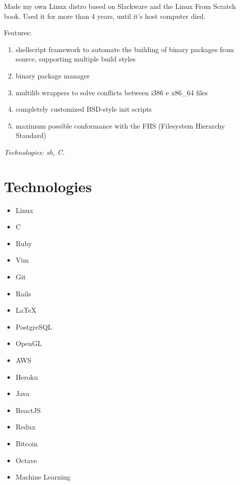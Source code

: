 \documentclass[a4paper]{simplecv}
\begin{document}
\begin{topic}
	Made my own Linux distro based on Slackware and the Linux From Scratch
	book. Used it for more than 4 years, until it's host computer died.

	Features:

	\begin{enumerate}
		\item shellscript framework to automate the building of binary
			packages from source, supporting multiple build styles

		\item binary package manager

		\item multilib wrappers to solve conflicts between i386 e
			x86\_64 files

		\item completely customized BSD-style init scripts

		\item maximum possible conformance with the FHS (Filesystem
			Hierarchy Standard)
	\end{enumerate}

	{\em\scriptsize Technologies: sh, C.}

\end{topic}

\section{Technologies}

\begin{multicols}{4}
	\raggedcolumns
	\begin{itemize}
		\item Linux
		\item C
		\item Ruby
		\item Vim
		\item Git
		\item Rails
		\item \LaTeX{}
		\item PostgreSQL
		\item OpenGL
		\item AWS
		\item Heroku
		\item Java
		\item ReactJS
		\item Redux
		\item Bitcoin
		\item Octave
		\item Machine Learning
	\end{itemize}
\end{multicols}
\end{document}
